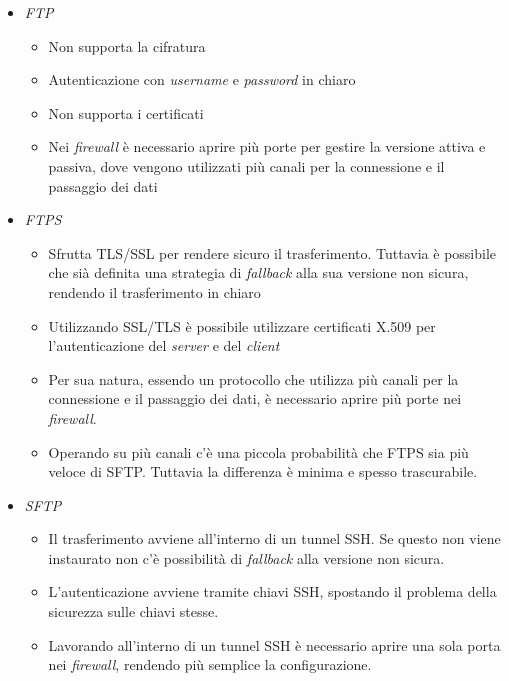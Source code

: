\begin{itemize}
    \item \emph{FTP}
        \begin{itemize}
            \item Non supporta la cifratura
            \item Autenticazione con \emph{username} e \emph{password} in chiaro
            \item Non supporta i certificati
            \item Nei \emph{firewall} è necessario aprire più porte per gestire la versione attiva e passiva, dove vengono utilizzati più canali per la connessione e il passaggio dei dati
        \end{itemize}
    \item \emph{FTPS}
        \begin{itemize}
            \item Sfrutta TLS/SSL per rendere sicuro il trasferimento. Tuttavia è possibile che sià definita una strategia di \emph{fallback} alla sua versione non sicura, rendendo il trasferimento in chiaro
            \item Utilizzando SSL/TLS è possibile utilizzare certificati X.509 per l'autenticazione del \emph{server} e del \emph{client}
            \item Per sua natura, essendo un protocollo che utilizza più canali per la connessione e il passaggio dei dati, è necessario aprire più porte nei \emph{firewall}.
            \item Operando su più canali c'è una piccola probabilità che FTPS sia più veloce di SFTP. Tuttavia la differenza è minima e spesso trascurabile.
        \end{itemize}
    \item \emph{SFTP}
        \begin{itemize}
            \item Il trasferimento avviene all'interno di un tunnel SSH. Se questo non viene instaurato non c'è possibilità di \emph{fallback} alla versione non sicura.
            \item L'autenticazione avviene tramite chiavi SSH, spostando il problema della sicurezza sulle chiavi stesse.
            \item Lavorando all'interno di un tunnel SSH è necessario aprire una sola porta nei \emph{firewall}, rendendo più semplice la configurazione.
        \end{itemize}
\end{itemize}

